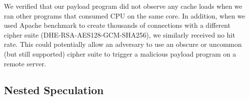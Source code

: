 We verified that our payload program did not observe any cache loads when we ran
other programs that consumed CPU on the same core. In addition, when we used
Apache benchmark to create thousands of connections with a different cipher
suite (DHE-RSA-AES128-GCM-SHA256), we similarly received no hit rate. This
could potentially allow an adversary to use an obscure or uncommon (but still
supported) cipher suite to trigger a malicious payload program on a remote server.



\subsection{Nested Speculation}
\label{subsec:nested-spec}

